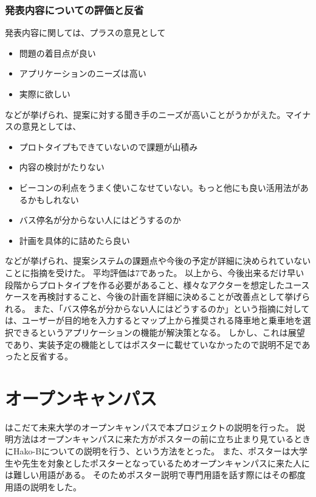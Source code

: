 \documentclass[openany,11pt,papersize]{jsbook}
\begin{document}

\subsubsection{発表内容についての評価と反省}
発表内容に関しては、プラスの意見として
\begin{itemize}

\item 問題の着目点が良い
\item アプリケーションのニーズは高い
\item 実際に欲しい

\end{itemize}
などが挙げられ、提案に対する聞き手のニーズが高いことがうかがえた。マイナスの意見としては、
\begin{itemize}

\item プロトタイプもできていないので課題が山積み
\item 内容の検討がたりない
\item ビーコンの利点をうまく使いこなせていない。もっと他にも良い活用法があるかもしれない
\item バス停名が分からない人にはどうするのか
\item 計画を具体的に詰めたら良い

\end{itemize}
などが挙げられ、提案システムの課題点や今後の予定が詳細に決められていないことに指摘を受けた。
平均評価は7であった。
以上から、今後出来るだけ早い段階からプロトタイプを作る必要があること、様々なアクターを想定したユースケースを再検討すること、今後の計画を詳細に決めることが改善点として挙げられる。
また、「バス停名が分からない人にはどうするのか」という指摘に対しては、ユーザーが目的地を入力するとマップ上から推奨される降車地と乗車地を選択できるというアプリケーションの機能が解決策となる。
しかし、これは展望であり、実装予定の機能としてはポスターに載せていなかったので説明不足であったと反省する。



\section{オープンキャンパス}
はこだて未来大学のオープンキャンパスで本プロジェクトの説明を行った。
説明方法はオープンキャンパスに来た方がポスターの前に立ち止まり見ているときにHako-Bについての説明を行う、という方法をとった。
また、ポスターは大学生や先生を対象としたポスターとなっているためオープンキャンパスに来た人には難しい用語がある。
そのためポスター説明で専門用語を話す際にはその都度用語の説明をした。
\end{document}
